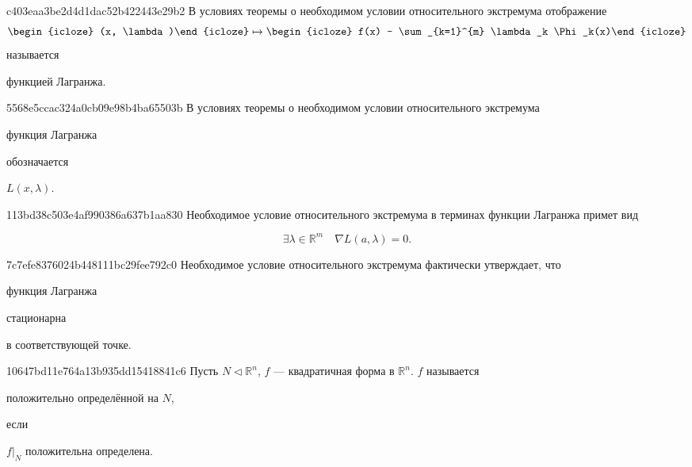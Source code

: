 \begin{note}{c403eaa3be2d4d1dac52b422443e29b2}
    В условиях теоремы о необходимом условии относительного экстремума отображение
    \[
        \begin{icloze}{3}(x, \lambda)\end{icloze} \mapsto \begin{icloze}{2}f(x) - \sum_{k=1}^{m} \lambda_k \Phi_k(x)\end{icloze}
    \]
    называется \begin{icloze}{1}функцией Лагранжа.\end{icloze}
\end{note}

\begin{note}{5568e5ccac324a0cb09e98b4ba65503b}
    В условиях теоремы о необходимом условии относительного экстремума \begin{icloze}{2}функция Лагранжа\end{icloze} обозначается \begin{icloze}{1}\({ L(x, \lambda) }\).\end{icloze}
\end{note}

\begin{note}{113bd38c503e4af990386a637b1aa830}
    Необходимое условие относительного экстремума в терминах функции Лагранжа примет вид
    \begin{icloze}{1}
        \[
            \exists \lambda \in \mathbb R^{m} \quad \nabla L(a, \lambda) = 0.
        \]
    \end{icloze}
\end{note}

\begin{note}{7c7efe8376024b448111bc29fee792c0}
    Необходимое условие относительного экстремума фактически утверждает, что \begin{icloze}{2}функция Лагранжа\end{icloze} \begin{icloze}{1}стационарна\end{icloze} в соответствующей точке.
\end{note}

\begin{note}{10647bd11e764a13b935dd15418841c6}
    Пусть \({ N \triangleleft \mathbb R^{n} }\), \({ f }\) --- квадратичная форма в \({ \mathbb R^{n} }\).
    \({ f }\) называется \begin{icloze}{2}положительно определённой на \({ N }\),\end{icloze} если \begin{icloze}{1}\({ f|_{N} }\) положительна определена.\end{icloze}
\end{note}

